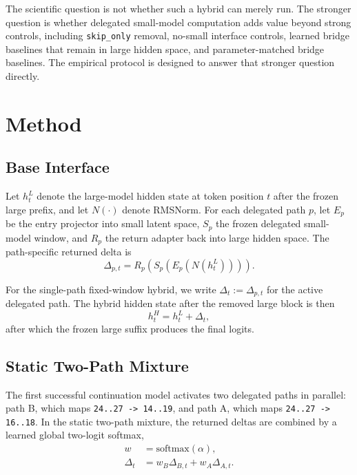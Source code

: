 \documentclass[11pt]{article}
\begin{document}
The scientific question is not whether such a hybrid can merely run. The stronger question is whether delegated small-model computation adds value beyond strong controls, including \texttt{skip\_only} removal, no-small interface controls, learned bridge baselines that remain in large hidden space, and parameter-matched bridge baselines. The empirical protocol is designed to answer that stronger question directly.

\section{Method}

\subsection{Base Interface}

Let $h_t^L$ denote the large-model hidden state at token position $t$ after the frozen large prefix, and let $N(\cdot)$ denote RMSNorm. For each delegated path $p$, let $E_p$ be the entry projector into small latent space, $S_p$ the frozen delegated small-model window, and $R_p$ the return adapter back into large hidden space. The path-specific returned delta is
\begin{equation}
\Delta_{p,t} = R_p(S_p(E_p(N(h_t^L)))).
\end{equation}

For the single-path fixed-window hybrid, we write $\Delta_t := \Delta_{p,t}$ for the active delegated path. The hybrid hidden state after the removed large block is then
\begin{equation}
h_t^H = h_t^L + \Delta_t,
\end{equation}
after which the frozen large suffix produces the final logits.

\subsection{Static Two-Path Mixture}

The first successful continuation model activates two delegated paths in parallel: path B, which maps \texttt{24..27 -> 14..19}, and path A, which maps \texttt{24..27 -> 16..18}. In the static two-path mixture, the returned deltas are combined by a learned global two-logit softmax,
\begin{align}
w &= \mathrm{softmax}(\alpha),\\
\Delta_t &= w_B \Delta_{B,t} + w_A \Delta_{A,t}.
\end{align}
\end{document}
